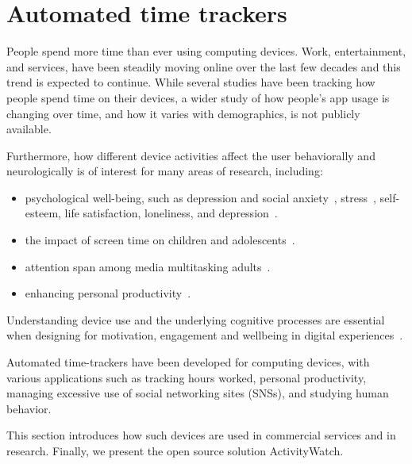 


\section{Automated time trackers}

    People spend more time than ever using computing devices. Work, entertainment, and services, have been steadily moving online over the last few decades and this trend is expected to continue.
    While several studies have been tracking how people spend time on their devices, a wider study of how people's app usage is changing over time, and how it varies with demographics, is not publicly available.

    Furthermore, how different device activities affect the user behaviorally and neurologically is of interest for many areas of research, including:

    \begin{itemize}
        \item psychological well-being, such as depression and social anxiety~\cite{selfhout_different_2009}\cite{shah_nonrecursive_2002}, stress~\cite{mark_stress_2014}, self-esteem, life satisfaction, loneliness, and depression~\cite{huang_time_2017}.
        \item the impact of screen time on children and adolescents~\cite{subrahmanyam_impact_2001}.
        \item attention span among media multitasking adults~\cite{mark_stress_2014}.
        \item enhancing personal productivity~\cite{kim_timeaware_2016}.
    \end{itemize}

    Understanding device use and the underlying cognitive processes are essential when designing for motivation, engagement and wellbeing in digital experiences~\cite{peters_designing_2018}.

    Automated time-trackers have been developed for computing devices, with various applications such as tracking hours worked, personal productivity, managing excessive use of social networking sites (SNSs), and studying human behavior.

    This section introduces how such devices are used in commercial services and in research. Finally, we present the open source solution ActivityWatch.

